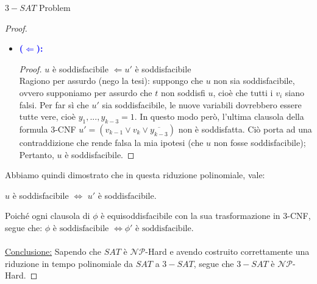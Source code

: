 \documentclass{article}  %
\theoremstyle{definition}
\begin{document}
\begin{theorem}{$3-SAT$ Problem}
\begin{proof}
\begin{itemize}
			\item \textcolor{blue}{\textbf{($\Longleftarrow$):}}
			      \begin{proof}
				      $u$ è soddisfacibile $\Longleftarrow u'$ è soddisfacibile \\
				      Ragiono per assurdo (nego la tesi): suppongo che $u$ non sia soddisfacibile, ovvero supponiamo per assurdo che $t$ non soddisfi $u$, cioè che tutti i $v_i$ siano falsi.
				      Per far sì che $u'$ sia soddisfacibile, le nuove variabili dovrebbero essere tutte vere, cioè $y_1,...,y_{k-3}=1$. In questo modo però, l'ultima clausola della formula 3-CNF
				      $u'=(v_{k-1} \lor v_k \lor \overline{y_{k-3}})$ non è soddisfatta. Ciò porta ad una contraddizione che rende falsa la mia ipotesi (che $u$ non fosse soddisfacibile);
				      Pertanto, $u$ è soddisfacibile.
			      \end{proof}
		\end{itemize}
		Abbiamo quindi dimostrato che in questa riduzione polinomiale, vale:
		\begin{center}
			$u$ è soddisfacibile $\iff$ $u'$ è soddisfacibile.
		\end{center}
		Poiché ogni clausola di $\phi$ è equisoddisfacibile con la sua trasformazione in 3-CNF, segue che: $\phi \text{ è soddisfacibile } \iff \phi' \text{ è soddisfacibile.}$ \\ \\
		\underline{Conclusione:} Sapendo che $SAT$ è $\mathcal{NP}$-Hard e avendo costruito correttamente una riduzione in tempo polinomiale da $SAT$ a $3-SAT$, segue
		che $3-SAT$ è $\mathcal{NP}$-Hard.
	\end{proof}
\end{theorem}
\end{document}
